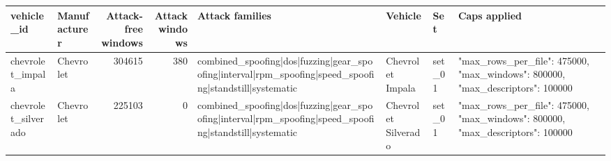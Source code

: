 \begin{tabular}{llrrllll}
\toprule
vehicle_id & Manufacturer & Attack-free windows & Attack windows & Attack families & Vehicle & Set & Caps applied \\
\midrule
chevrolet_impala & Chevrolet & 304615 & 380 & combined_spoofing|dos|fuzzing|gear_spoofing|interval|rpm_spoofing|speed_spoofing|standstill|systematic & Chevrolet Impala & set_01 & {"max_rows_per_file": 475000, "max_windows": 800000, "max_descriptors": 100000} \\
chevrolet_silverado & Chevrolet & 225103 & 0 & combined_spoofing|dos|fuzzing|gear_spoofing|interval|rpm_spoofing|speed_spoofing|standstill|systematic & Chevrolet Silverado & set_01 & {"max_rows_per_file": 475000, "max_windows": 800000, "max_descriptors": 100000} \\
\bottomrule
\end{tabular}
